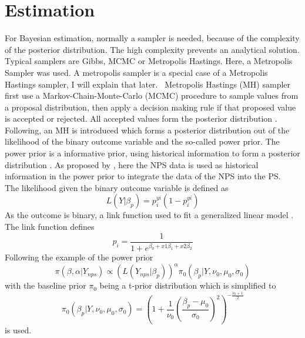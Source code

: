 \documentclass[10.5pt]{article}
\begin{document}
\section{Estimation}
For Bayesian estimation, normally a sampler is needed, because of the complexity of the posterior distribution. The high complexity prevents an analytical solution.\\
Typical samplers are Gibbs, MCMC or Metropolis Hastings. Here, a Metropolis Sampler was used. A metropolis sampler is a special case of a Metropolis Hastings sampler, I will explain that later. \
Metropolis Hastings (MH) sampler first use a Markov-Chain-Monte-Carlo (MCMC) procedure to sample values from a proposal distribution, then apply a decision making rule if that proposed value is accepted or rejected. All accepted values form the posterior distribution \cite{chib1995understanding}. \\
Following, an MH is introduced which forms a posterior distribution out of the likelihood of the binary outcome variable and the so-called power prior. The power prior is a informative prior, using historical information to form a posterior distribution \citep{ibrahim2015power}. As proposed by \cite{salvatore2024bayesian}, here the NPS data is used as historical information in the power prior to integrate the data of the NPS into the PS. \\
The likelihood given the binary outcome variable is defined as
\begin{equation}
    L(Y|\beta_p) = p_i^{yi}(1-p_i^{yi})
\end{equation}
As the outcome is binary, a link function used to fit a generalized linear model \citep{mccullagh2019generalized}. The link function defines
\begin{equation}
    p_i = \frac{1}{1+e^{\beta_0 + x1\beta_1 + x2\beta_2}}
\end{equation}
Following the example of \cite{salvatore2024bayesian} the power prior 
\begin{equation}
    \pi(\beta, \alpha | Y_{nps}) \propto (L(Y_{nps}|\beta_p))^{\alpha}\pi_0(\beta_p|Y, \nu_0, \mu_0, \sigma_0)
\end{equation}
with the baseline prior \(\pi_0\) being a t-prior distribution which is simplified to
\begin{equation}
    \pi_0(\beta_p|Y, \nu_0, \mu_0, \sigma_0) = (1+\frac{1}{\nu_0}(\frac{\beta_p - \mu_0}{\sigma_0})^2)^{-\frac{\nu_0+1}{2}}
\end{equation}
is used. \\
\end{document}
